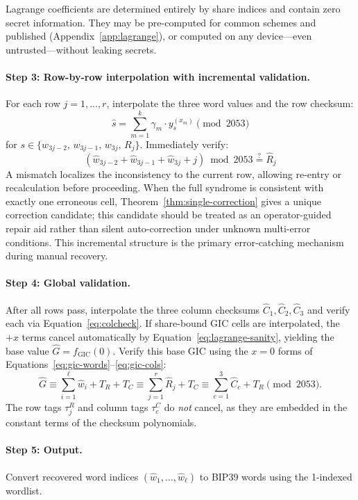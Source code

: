 \documentclass[11pt]{article}
\begin{document}
Lagrange coefficients are determined entirely by share indices and contain zero secret information. They may be pre-computed for common schemes and published (Appendix~\ref{app:lagrange}), or computed on any device---even untrusted---without leaking secrets.

\paragraph{Step 3: Row-by-row interpolation with incremental validation.} For each row $j = 1, \ldots, r$, interpolate the three word values and the row checksum:
\[
    \hat{s} = \sum_{m=1}^{k} \gamma_m \cdot y_s^{(x_m)} \pmod{2053}
\]
for $s \in \{w_{3j-2},\, w_{3j-1},\, w_{3j},\, R_j\}$. Immediately verify:
\[
    (\hat{w}_{3j-2} + \hat{w}_{3j-1} + \hat{w}_{3j} + j) \bmod 2053 \stackrel{?}{=} \hat{R}_j
\]
A mismatch localizes the inconsistency to the current row, allowing re-entry or recalculation before proceeding. When the full syndrome is consistent with exactly one erroneous cell, Theorem~\ref{thm:single-correction} gives a unique correction candidate; this candidate should be treated as an operator-guided repair aid rather than silent auto-correction under unknown multi-error conditions. This incremental structure is the primary error-catching mechanism during manual recovery.

\paragraph{Step 4: Global validation.} After all rows pass, interpolate the three column checksums $\hat{C}_1, \hat{C}_2, \hat{C}_3$ and verify each via Equation~\eqref{eq:colcheck}. If share-bound GIC cells are interpolated, the $+x$ terms cancel automatically by Equation~\eqref{eq:lagrange-sanity}, yielding the base value $\hat{G}=f_{\text{GIC}}(0)$. Verify this base GIC using the $x=0$ forms of Equations~\eqref{eq:gic-words}--\eqref{eq:gic-cols}:
\[
    \hat{G}
    \equiv \sum_{i=1}^{\ell} \hat{w}_i + T_R + T_C
    \equiv \sum_{j=1}^{r} \hat{R}_j + T_C
    \equiv \sum_{c=1}^{3} \hat{C}_c + T_R
    \pmod{2053}.
\]
The row tags $\tau^R_j$ and column tags $\tau^C_c$ do \emph{not} cancel, as they are embedded in the constant terms of the checksum polynomials.

\paragraph{Step 5: Output.} Convert recovered word indices $(\hat{w}_1, \ldots, \hat{w}_\ell)$ to BIP39 words using the 1-indexed wordlist.
\end{document}
